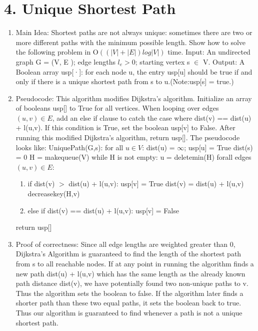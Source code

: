 \documentclass[11pt]{article}
\begin{document}
\newpage
\section*{4. Unique Shortest Path}
\begin{enumerate}
\item Main Idea:
Shortest paths are not always unique: sometimes there are two or more different paths with the minimum possible length. Show how to solve the following problem in O$((|V | + |E |) log |V |)$ time.\newline
Input: An undirected graph G = (V, E ); edge lengths $l_e > 0$; starting vertex s $\in$ V.\newline
Output: A Boolean array usp[·]: for each node u, the entry usp[u] should be true if and only if there
is a unique shortest path from s to u.(Note:usp[s] = true.)
\item Pseudocode: This algorithm modifies Dijkstra's algorithm. Initialize an array of booleans usp[] to True for all vertices. When looping over edges $(u,v)\in E$, add an else if clause to catch the case where dist(v) == dist(u) + l(u,v). If this condition is True, set the boolean usp[v] to False. After running this modified Dijkstra's algorithm, return usp[]. The pseudocode looks like:\newline
UniquePath(G,s):\newline
for all $u \in V$: dist(u) = $\infty$; usp[u] = True\newline
dist(s) = 0\newline
H = makequeue(V)\newline
while H is not empty:\newline
	u = deletemin(H)\newline
	forall edges $(u,v) \in E$:
		\begin{enumerate}
		\item if dist(v) $>$ dist(u) + l(u,v):\newline
			usp[v] = True
			dist(v) = dist(u) + l(u,v)\newline
			decreasekey(H,v)\newline
		\item else if dist(v) == dist(u) + l(u,v):\newline
			usp[v] = False
		\end{enumerate}
return usp[]\newline
\item Proof of correctness: Since all edge lengths are weighted greater than 0, Dijkstra's Algorithm is guaranteed to find the length of the shortest path from s to all reachable nodes. If at any point in running the algorithm finds a new path dist(u) + l(u,v) which has the same length as the already known path distance dist(v), we have potentially found two non-unique paths to v. Thus the algorithm sets the boolean to false. If the algorithm later finds a shorter path than these two equal paths, it sets the boolean back to true. Thus our algorithm is guaranteed to find whenever a path is not a unique shortest path.

\end{enumerate}
\end{document}
